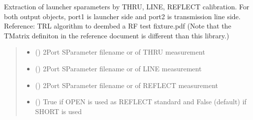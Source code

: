 \documentclass[letterpaper,10pt,english]{sphinxmanual}
\begin{document}

\begin{fulllineitems}
\label{\detokenize{touchstone:touchstone.trl_launcher_extraction}}
\pysigstartsignatures
{}
\pysigstopsignatures
\sphinxAtStartPar
Extraction of launcher s\sphinxhyphen{}parameters by THRU, LINE, REFLECT calibration. For both output  objects, port\sphinxhyphen{}1 is launcher side and port\sphinxhyphen{}2 is transmission line side.
Reference: TRL algorithm to de\sphinxhyphen{}embed a RF test fixture.pdf (Note that the T\sphinxhyphen{}Matrix definiton in the reference document is different than this library.)
\begin{quote}\begin{description}
\begin{itemize}
\item {} 
\sphinxAtStartPar
{} () \textendash{} 2\sphinxhyphen{}Port S\sphinxhyphen{}Parameter filename or  of THRU measurement

\item {} 
\sphinxAtStartPar
{} () \textendash{} 2\sphinxhyphen{}Port S\sphinxhyphen{}Parameter filename or  of LINE measurement

\item {} 
\sphinxAtStartPar
{} () \textendash{} 2\sphinxhyphen{}Port S\sphinxhyphen{}Parameter filename or  of REFLECT measurement

\item {} 
\sphinxAtStartPar
{} () \textendash{} True if OPEN is used as REFLECT standard and False (default) if SHORT is used

\end{itemize}


\end{description}
\end{quote}
\end{fulllineitems}
\end{document}
